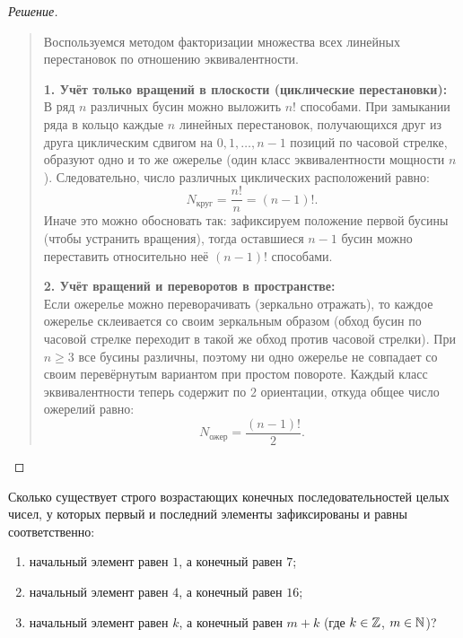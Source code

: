\begin{proof}[Решение]~\\
    \begin{quote}
        Воспользуемся методом факторизации множества всех линейных 
        перестановок по отношению эквивалентности.

        \textbf{1. Учёт только вращений в плоскости (циклические 
        перестановки):}\\
        В ряд $n$ различных бусин можно выложить $n!$ способами. При 
        замыкании ряда в кольцо каждые $n$ линейных перестановок, 
        получающихся друг из друга циклическим сдвигом на 
        $0, 1, \dots, n - 1$ позиций по часовой стрелке, образуют одно и 
        то же ожерелье (один класс эквивалентности мощности $n$). 
        Следовательно, число различных циклических расположений равно:
        \begin{equation} \label{eq:circ_perm}
            N_{\text{круг}} = \frac{n!}{n} = (n - 1)!. \tag{8}
        \end{equation}
        Иначе это можно обосновать так: зафиксируем положение первой бусины 
        (чтобы устранить вращения), тогда оставшиеся $n - 1$ бусин можно 
        переставить относительно неё $(n - 1)!$ способами.

        \textbf{2. Учёт вращений и переворотов в пространстве:}\\
        Если ожерелье можно переворачивать (зеркально отражать), то 
        каждое ожерелье склеивается со своим зеркальным образом (обход 
        бусин по часовой стрелке переходит в такой же обход против часовой 
        стрелки). При $n \ge 3$ все бусины различны, поэтому ни одно 
        ожерелье не совпадает со своим перевёрнутым вариантом при простом 
        повороте. Каждый класс эквивалентности теперь содержит по $2$ 
        ориентации, откуда общее число ожерелий равно:
        \begin{equation} \label{eq:necklace_count}
            N_{\text{ожер}} = \frac{(n - 1)!}{2}. \tag{9}
        \end{equation}
    \end{quote}
\end{proof}

\begin{problem}
    Сколько существует строго возрастающих конечных последовательностей 
    целых чисел, у которых первый и последний элементы зафиксированы и 
    равны соответственно:
    \begin{enumerate}
        \item начальный элемент равен $1$, а конечный равен $7$;
        \item начальный элемент равен $4$, а конечный равен $16$;
        \item начальный элемент равен $k$, а конечный равен $m + k$ 
        (где $k \in \mathbb{Z}$, $m \in \mathbb{N}$)?
    \end{enumerate}
\end{problem}

